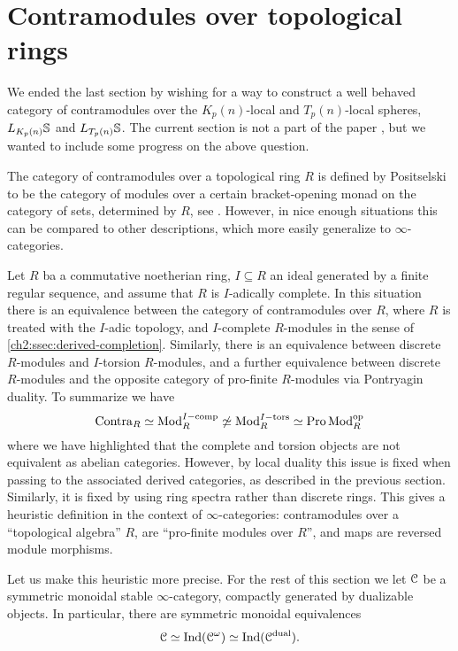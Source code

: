 
\section{Contramodules over topological rings}
\label{ch2:addendum}

We ended the last section by wishing for a way to construct a well behaved category of contramodules over the $K_p(n)$-local and $T_p(n)$-local spheres, $L_\Kpn\S$ and $L_{T_p(n)}\S$. The current section is not a part of the paper \cite{aambo_2024_positselski}, but we wanted to include some progress on the above question. 

The category of contramodules over a topological ring $R$ is defined by Positselski to be the category of modules over a certain bracket-opening monad on the category of sets, determined by $R$, see \cite{positselski_2022_contramodules}. However, in nice enough situations this can be compared to other descriptions, which more easily generalize to $\infty$-categories. 

\begin{remark}
    \label{ch2:rm:contra-as-op-pro-modules}
    Let $R$ ba a commutative noetherian ring, $I\subseteq R$ an ideal generated by a finite regular sequence, and assume that $R$ is $I$-adically complete. In this situation there is an equivalence between the category of contramodules over $R$, where $R$ is treated with the $I$-adic topology, and $I$-complete $R$-modules in the sense of \cref{ch2:ssec:derived-completion}. Similarly, there is an equivalence between discrete $R$-modules and $I$-torsion $R$-modules, and a further equivalence between discrete $R$-modules and the opposite category of pro-finite $R$-modules via Pontryagin duality. To summarize we have  
    \[\Contra_R \simeq \Mod_R\Icomp \not\simeq \Mod_R\Itors\simeq \Pro\Mod_R\op\]
    where we have highlighted that the complete and torsion objects are not equivalent as abelian categories. However, by local duality this issue is fixed when passing to the associated derived categories, as described in the previous section. Similarly, it is fixed by using ring spectra rather than discrete rings. This gives a heuristic definition in the context of $\infty$-categories: contramodules over a ``topological algebra'' $R$, are ``pro-finite modules over $R$'', and maps are reversed module morphisms.  
\end{remark}

Let us make this heuristic more precise. For the rest of this section we let $\C$ be a symmetric monoidal stable $\infty$-category, compactly generated by dualizable objects. In particular, there are symmetric monoidal equivalences 
\[\C \simeq \Ind(\C^\omega) \simeq \Ind(\C\dual).\]

